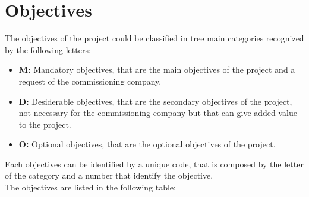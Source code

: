 %

\section{Objectives}
The objectives of the project could be classified in tree main categories recognized by the following letters:
\begin{itemize}
    \item \textbf{M:} Mandatory objectives, that are the main objectives of the project and a request of the commissioning company.
    \item \textbf{D:} Desiderable objectives, that are the secondary objectives of the project, not necessary
    for the commissioning company but that can give added value to the project.
    \item \textbf{O:} Optional objectives, that are the optional objectives of the project.
\end{itemize}
Each objectives can be identified by a unique code, that is composed by the letter of the category and a number that identify the objective.\\
The objectives are listed in the following table:

